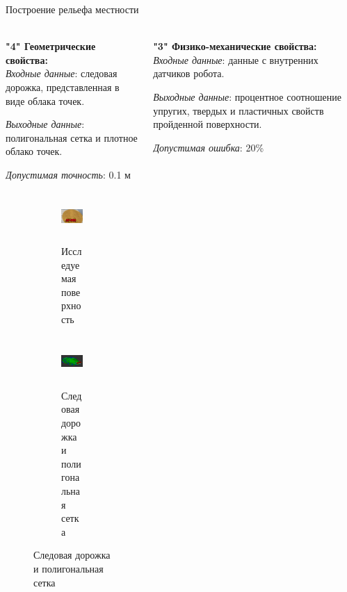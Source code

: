 \begin{frame}[t]{Построение рельефа местности}
    \framesubtitle{}
    \begin{columns}[T,onlytextwidth]
        \begin{column}{0.49\textwidth}
            \textbf{"4" Геометрические свойства:}\\
            \textit{Входные данные}: следовая дорожка, представленная в виде облака точек.

            \textit{Выходные данные}: полигональная сетка и плотное облако точек.

            \textit{Допустимая точность}: 0.1 м
            \begin{figure}[H]
                \begin{subfigure}[t]{0.49\textwidth}
                    \centering\includegraphics[height=1.9cm,width=1\textwidth,keepaspectratio]{../images/slides/surface_research.png}
                    \caption*{Исследуемая поверхность}
                \end{subfigure}
                \begin{subfigure}[t]{0.49\textwidth}
                    \centering\includegraphics[height=1.9cm,width=1\textwidth,keepaspectratio]{../images/slides/result_research.png}
                    \caption*{Следовая дорожка и полигональная сетка}
                \end{subfigure}
            \end{figure}
        \end{column}
        \begin{column}{0.49\textwidth}
            \textbf{"3" Физико-механические свойства:}\\
            \textit{Входные данные}: данные с внутренних датчиков робота.

            \textit{Выходные данные}: процентное соотношение упругих, твердых и пластичных свойств пройденной поверхности.

            \textit{Допустимая ошибка}: 20\% 


\end{column}
\end{columns}
\end{frame}
